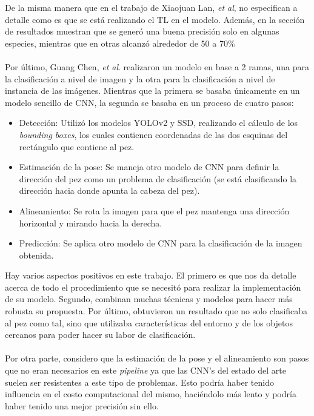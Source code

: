 De la misma manera que en el trabajo de Xiaojuan Lan, \textit{et al}, no especifican a detalle 
como es que se está realizando el TL en el modelo. Además, en la sección de resultados 
muestran que se generó una buena precisión solo en algunas especies, mientras que en otras 
alcanzó alrededor de 50 a 70\% \\\\

Por último, Guang Chen, \textit{et al}. \cite{8371919} realizaron un modelo en base a 2 ramas, 
una para la clasificación a nivel de imagen y la otra para la clasificación a nivel de instancia 
de las imágenes. Mientras que la primera se basaba únicamente en un modelo sencillo de CNN, la 
segunda se basaba en un proceso de cuatro pasos:
\begin{itemize}
    \item Detección: Utilizó los modelos YOLOv2 y SSD, realizando el cálculo de los \textit{bounding boxes}, los cuales contienen coordenadas de las dos esquinas del rectángulo que contiene al pez.
    \item Estimación de la pose: Se maneja otro modelo de CNN para definir la dirección del pez como un problema de clasificación (se está clasificando la dirección hacia donde apunta la cabeza del pez).
    \item Alineamiento: Se rota la imagen para que el pez mantenga una dirección horizontal y mirando hacia la derecha.
    \item Predicción: Se aplica otro modelo de CNN para la clasificación de la imagen obtenida.
\end{itemize}
Hay varios aspectos positivos en este trabajo. El primero es que nos da detalle acerca de todo 
el procedimiento que se necesitó para realizar la implementación de su modelo. Segundo, combinan 
muchas técnicas y modelos para hacer más robusta su propuesta. Por último, obtuvieron un resultado 
que no solo clasificaba al pez como tal, sino que utilizaba características del entorno y de los 
objetos cercanos para poder hacer su labor de clasificación. \\\\

Por otra parte, considero que la estimación de la pose y el alineamiento son pasos que no eran 
necesarios en este \textit{pipeline} ya que las CNN's del estado del arte suelen ser resistentes 
a este tipo de problemas. Esto podría haber tenido influencia en el costo computacional del mismo, 
haciéndolo más lento y podría haber tenido una mejor precisión sin ello. \\\\

